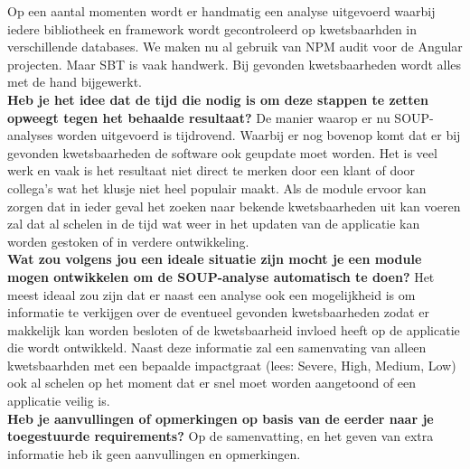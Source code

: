 Op een aantal momenten wordt er handmatig een analyse uitgevoerd waarbij iedere bibliotheek en framework wordt gecontroleerd op kwetsbaarhden in verschillende databases. We maken nu al gebruik van NPM audit voor de Angular projecten. Maar SBT is vaak handwerk. Bij gevonden kwetsbaarheden wordt alles met de hand bijgewerkt.
\\

\textbf{Heb je het idee dat de tijd die nodig is om deze stappen te zetten opweegt tegen het behaalde resultaat? } De manier waarop er nu SOUP-analyses worden uitgevoerd is tijdrovend. Waarbij er nog bovenop komt dat er bij gevonden kwetsbaarheden de software ook geupdate moet worden. Het is veel werk en vaak is het resultaat niet direct te merken door een klant of door collega's wat het klusje niet heel populair maakt. Als de module ervoor kan zorgen dat in ieder geval het zoeken naar bekende kwetsbaarheden uit kan voeren zal dat al schelen in de tijd wat weer in het updaten van de applicatie kan worden gestoken of in verdere ontwikkeling.
\\



\textbf{Wat zou volgens jou een ideale situatie zijn mocht je een module mogen ontwikkelen om de SOUP-analyse automatisch te doen? }Het meest ideaal zou zijn dat er naast een analyse ook een mogelijkheid is om informatie te verkijgen over de eventueel gevonden kwetsbaarheden zodat er makkelijk kan worden besloten of de kwetsbaarheid invloed heeft op de applicatie die wordt ontwikkeld. Naast deze informatie zal een samenvating van alleen kwetsbaarhden met een bepaalde impactgraat (lees: Severe, High, Medium, Low) ook al schelen op het moment dat er snel moet worden aangetoond of een applicatie veilig is.
\\

\textbf{Heb je aanvullingen of opmerkingen op basis van de eerder naar je toegestuurde requirements? } Op de samenvatting, en het geven van extra informatie heb ik geen aanvullingen en opmerkingen.
\\

